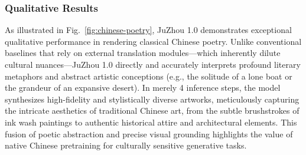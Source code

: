 \subsubsection{Qualitative Results}
\label{sec:QualitativeResults}
As illustrated in Fig.~\ref{fig:chinese-poetry}, JuZhou 1.0 demonstrates exceptional qualitative performance in rendering classical Chinese poetry. Unlike conventional baselines that rely on external translation modules---which inherently dilute cultural nuances---JuZhou 1.0 directly and accurately interprets profound literary metaphors and abstract artistic conceptions (e.g., the solitude of a lone boat or the grandeur of an expansive desert). In merely 4 inference steps, the model synthesizes high-fidelity and stylistically diverse artworks, meticulously capturing the intricate aesthetics of traditional Chinese art, from the subtle brushstrokes of ink wash paintings to authentic historical attire and architectural elements. This fusion of poetic abstraction and precise visual grounding highlights the value of native Chinese pretraining for culturally sensitive generative tasks.